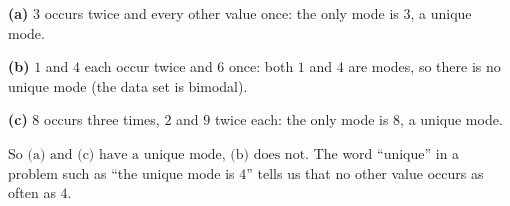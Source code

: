 \textbf{(a)} $3$ occurs twice and every other value once: the only mode is $3$, a unique mode.

\textbf{(b)} $1$ and $4$ each occur twice and $6$ once: both $1$ and $4$ are modes, so there is no unique mode (the data set is bimodal).

\textbf{(c)} $8$ occurs three times, $2$ and $9$ twice each: the only mode is $8$, a unique mode.

So $\boxed{\text{(a) and (c) have a unique mode, (b) does not}}$. The word ``unique'' in a problem such as ``the unique mode is $4$'' tells us that no other value occurs as often as $4$.
